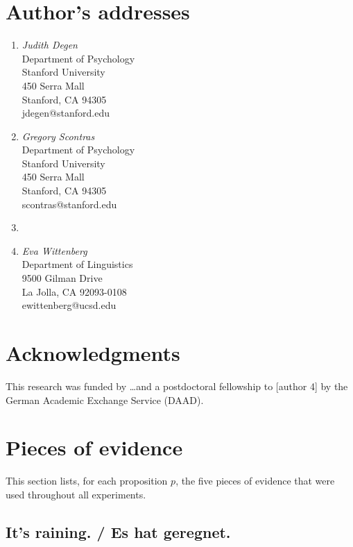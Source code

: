 \documentclass[11pt]{article}
\begin{document}
\section*{Author's addresses}
\begin{enumerate}
\item \emph{Judith Degen}\\ Department of Psychology\\ Stanford University\\ 450 Serra Mall\\ Stanford, CA 94305\\ jdegen@stanford.edu
\item \emph{Gregory Scontras}\\ Department of Psychology\\ Stanford University\\ 450 Serra Mall\\ Stanford, CA 94305\\ scontras@stanford.edu
\item
\item \emph{Eva Wittenberg}\\ Department of Linguistics \\ 9500 Gilman Drive\\
La Jolla, CA 92093-0108\\ ewittenberg@ucsd.edu
\end{enumerate}


\section*{Acknowledgments}
This research was funded by \dots and a postdoctoral fellowship to [author 4] by the German Academic Exchange Service (DAAD).


   



\appendix

\section{Pieces of evidence}
\label{sec:evidence}

This section lists, for each proposition $p$, the five pieces of evidence that were used throughout all experiments.

\subsection{It's raining. / Es hat geregnet.}
\end{document}
